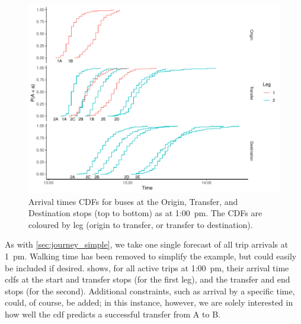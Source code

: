 \begin{knitrout}\small
{}\color{fgcolor}\begin{figure}

{\centering \includegraphics[width=\textwidth]{figure/eta_journey_transfer_graph-1} 

}

\caption[Arrival times CDFs for buses at the Origin, Transfer, and Destination stops]{Arrival times CDFs for buses at the Origin, Transfer, and Destination stops (top to bottom) as at 1:00~pm. The CDFs are coloured by leg (origin to transfer, or transfer to destination).}\label{fig:eta_journey_transfer_graph}
\end{figure}


\end{knitrout}


As with \cref{sec:journey_simple}, we take one single forecast of all trip arrivals at 1~pm. Walking time has been removed to simplify the example, but could easily be included if desired.  shows, for all active trips at  1:00~pm, their arrival time \glspl{cdf} at the start and transfer stops (for the first leg), and the transfer and end stops (for the second). Additional constraints, such as arrival by a specific time, could, of course, be added; in this instance, however, we are solely interested in how well the \pf{} \gls{cdf} predicts a successful transfer from A to B.


